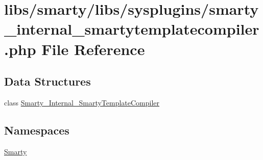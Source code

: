 \hypertarget{smarty__internal__smartytemplatecompiler_8php}{}\section{libs/smarty/libs/sysplugins/smarty\+\_\+internal\+\_\+smartytemplatecompiler.php File Reference}
\label{smarty__internal__smartytemplatecompiler_8php}
\subsection*{Data Structures}
\begin{DoxyCompactItemize}
\item 
class \hyperlink{class_smarty___internal___smarty_template_compiler}{Smarty\+\_\+\+Internal\+\_\+\+Smarty\+Template\+Compiler}
\end{DoxyCompactItemize}
\subsection*{Namespaces}
\begin{DoxyCompactItemize}
\item 
 \hyperlink{namespace_smarty}{Smarty}
\end{DoxyCompactItemize}
